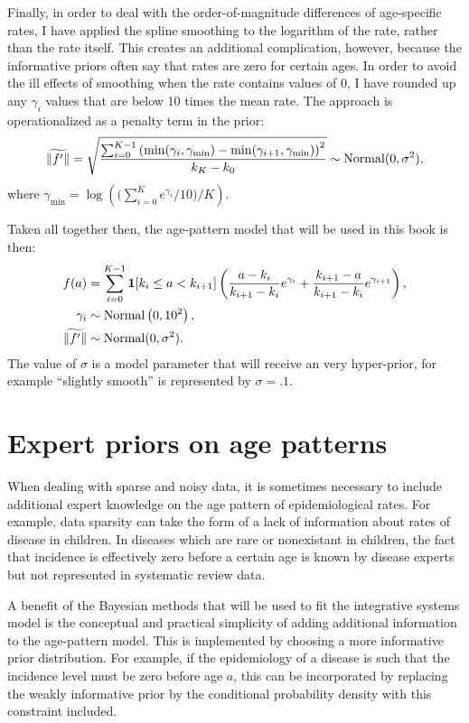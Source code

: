 Finally, in order to deal with the order-of-magnitude differences of
age-specific rates, I have applied the spline smoothing to the
logarithm of the rate, rather than the rate itself.  This creates an additional
complication, however, because the informative priors often say that
rates are zero for certain ages.  In order to avoid the ill effects of
smoothing when the rate contains values of $0$, I have
rounded up any $\gamma_i$ values that are below 10 times the mean
rate.  The approach is operationalized as a penalty term in the prior:
\[
\widetilde{\|f'\|} = \sqrt{\frac{\sum_{i=0}^{K-1} 
\left(\min(\gamma_i, \gamma_{\min})
-
\min(\gamma_{i+1}, \gamma_{\min})\right)^2
}{k_K-k_0} } \sim \operatorname{Normal}(0, \sigma^2),
\]
where $\gamma_{\min} = \log\left(\bigg(\sum_{i=0}^K e^{\gamma_i}/10\bigg)
/ K\right)$.


Taken all together then, the age-pattern model that will be used in this
book is then:
\begin{align*}
f(a) &= \sum_{i=0}^{K-1} \mathbf{1}[k_i \leq a < k_{i+1}]\left( \frac{a-k_i}{k_{i+1}-k_i} e^{\gamma_i} + \frac{k_{i+1}-a}{k_{i+1}-k_i} e^{\gamma_{i+1}}\right),\\
\gamma_i &\sim \operatorname{Normal}\left(0, 10^2\right),\\
\widetilde{\|f'\|} &\sim \operatorname{Normal}(0, \sigma^2).\\
\end{align*}
The value of $\sigma$ is a model parameter that will
receive an very hyper-prior, for example ``slightly smooth'' is represented by $\sigma=.1$.




\chapter{Expert priors on age patterns}

When dealing with sparse and noisy data, it is sometimes necessary to
include additional expert knowledge on the age pattern of
epidemiological rates.  For example, data sparsity can take the form
of a lack of information about rates of disease in children.  In
diseases which are rare or nonexistant in children, the fact that incidence is
effectively zero before a certain age is known by disease experts but
not represented in systematic review data.

A benefit of the Bayesian methods that will be used to fit the
integrative systems model is the conceptual and practical simplicity
of adding additional information to the age-pattern model.  This is
implemented by choosing a more informative prior distribution.  For
example, if the epidemiology of a disease is such that the incidence
level must be zero before age $a$, this can be incorporated by
replacing the weakly informative prior by the conditional probability
density with this constraint included.


